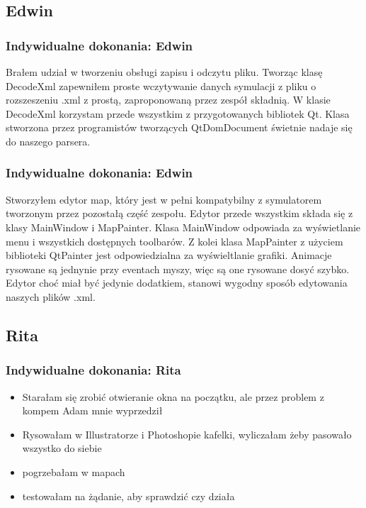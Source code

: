 \documentclass[a4paper, 11pt]{beamer}
\begin{document}
\subsection{Edwin}
\begin{frame}
\frametitle{Indywidualne dokonania: Edwin}
Brałem udział w tworzeniu obsługi zapisu i odczytu pliku. Tworząc klasę DecodeXml zapewniłem proste wczytywanie danych symulacji z pliku o rozszeszeniu .xml z prostą, zaproponowaną przez zespół składnią. W klasie DecodeXml korzystam przede wszystkim z przygotowanych bibliotek Qt. Klasa stworzona przez programistów tworzących QtDomDocument świetnie nadaje się do naszego parsera.
\end{frame}
\begin{frame}
\frametitle{Indywidualne dokonania: Edwin}
Stworzyłem edytor map, który jest w pełni kompatybilny z symulatorem tworzonym przez pozostałą część zespołu. Edytor przede wszystkim składa się z klasy MainWindow i MapPainter. Klasa MainWindow odpowiada za wyświetlanie menu i wszystkich dostępnych toolbarów. Z kolei klasa MapPainter z użyciem biblioteki QtPainter jest odpowiedzialna za wyświeltlanie grafiki. Animacje rysowane są jednynie przy eventach myszy, więc są one rysowane dosyć szybko. Edytor choć miał być jedynie dodatkiem, stanowi wygodny sposób edytowania naszych plików .xml.
\end{frame}
\subsection{Rita}
\begin{frame}
\frametitle{Indywidualne dokonania: Rita}
\begin{itemize}
\item Starałam się zrobić otwieranie okna na początku, ale przez problem z kompem Adam mnie wyprzedził 
\item Rysowałam w Illustratorze i Photoshopie kafelki, wyliczałam żeby pasowało wszystko do siebie
\item pogrzebałam w mapach
\item testowałam na żądanie, aby sprawdzić czy działa
\end{itemize}
\end{frame}
\end{document}
